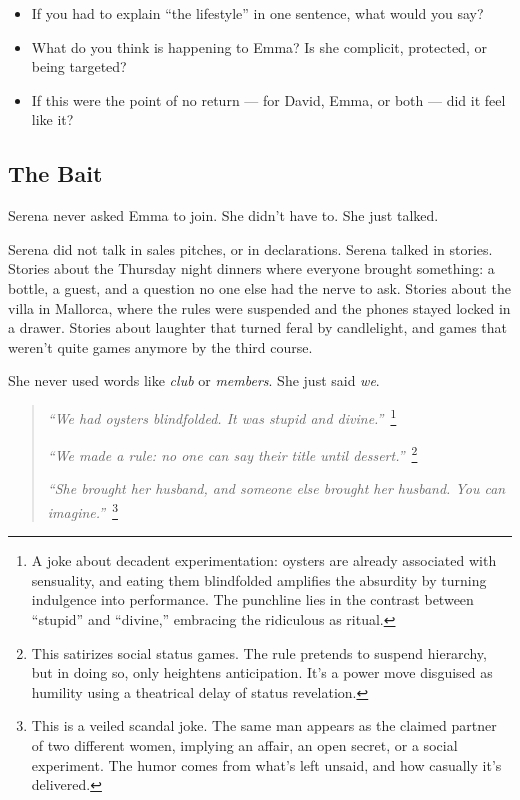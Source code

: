 \begin{itemize}
  \item If you had to explain “the lifestyle” in one sentence, what would you say?
  \item What do you think is happening to Emma? Is she complicit, protected, or being targeted?
  \item If this were the point of no return — for David, Emma, or both — did it feel like it?
\end{itemize}










\subsection{The Bait}

Serena never asked Emma to join.  
She didn’t have to.
She just talked.

Serena did not talk in sales pitches, or in declarations. Serena talked in stories.  
Stories about the Thursday night dinners where everyone brought something: a bottle, a guest, 
and a question no one else had the nerve to ask.  
Stories about the villa in Mallorca, where the rules were suspended and the phones stayed locked in a drawer.  
Stories about laughter that turned feral by candlelight, and games that weren’t quite games anymore by the third course.

She never used words like \textit{club} or \textit{members}.  
She just said \textit{we}.

\begin{quote}
  \textit{``We had oysters blindfolded. It was stupid and divine.''}\ \footnote{A joke about decadent 
  experimentation: oysters are already associated with sensuality, and eating them blindfolded amplifies 
  the absurdity by turning indulgence into performance. The punchline lies in the contrast between 
  “stupid” and “divine,” embracing the ridiculous as ritual.}

  \textit{``We made a rule: no one can say their title until dessert.''}\ \footnote{This satirizes social status 
  games. The rule pretends to suspend hierarchy, but in doing so, only heightens anticipation. It’s a power 
  move disguised as humility using a theatrical delay of status revelation.}

  \textit{``She brought her husband, and someone else brought her husband. You can imagine.''}\ \footnote{This 
  is a veiled scandal joke. The same man appears as the claimed partner of two different women, implying 
  an affair, an open secret, or a social experiment. The humor comes from what’s left unsaid, and 
  how casually it's delivered.}
\end{quote}

